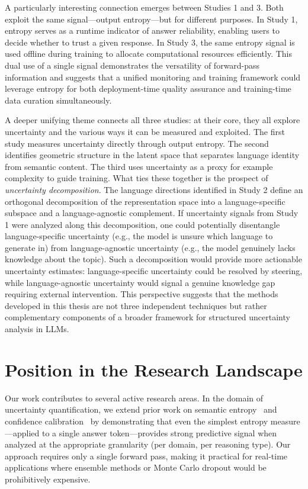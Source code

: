 A particularly interesting connection emerges between Studies 1 and 3. Both exploit the same signal---output entropy---but for different purposes. In Study 1, entropy serves as a runtime indicator of answer reliability, enabling users to decide whether to trust a given response. In Study 3, the same entropy signal is used offline during training to allocate computational resources efficiently. This dual use of a single signal demonstrates the versatility of forward-pass information and suggests that a unified monitoring and training framework could leverage entropy for both deployment-time quality assurance and training-time data curation simultaneously.

A deeper unifying theme connects all three studies: at their core, they all explore uncertainty and the various ways it can be measured and exploited. The first study measures uncertainty directly through output entropy. The second identifies geometric structure in the latent space that separates language identity from semantic content. The third uses uncertainty as a proxy for example complexity to guide training. What ties these together is the prospect of \textit{uncertainty decomposition}. The language directions identified in Study 2 define an orthogonal decomposition of the representation space into a language-specific subspace and a language-agnostic complement. If uncertainty signals from Study 1 were analyzed along this decomposition, one could potentially disentangle language-specific uncertainty (e.g., the model is unsure which language to generate in) from language-agnostic uncertainty (e.g., the model genuinely lacks knowledge about the topic). Such a decomposition would provide more actionable uncertainty estimates: language-specific uncertainty could be resolved by steering, while language-agnostic uncertainty would signal a genuine knowledge gap requiring external intervention. This perspective suggests that the methods developed in this thesis are not three independent techniques but rather complementary components of a broader framework for structured uncertainty analysis in LLMs.

\section{Position in the Research Landscape}

Our work contributes to several active research areas. In the domain of uncertainty quantification, we extend prior work on semantic entropy~\cite{kuhn2023semantic} and confidence calibration~\cite{guo2017calibration} by demonstrating that even the simplest entropy measure---applied to a single answer token---provides strong predictive signal when analyzed at the appropriate granularity (per domain, per reasoning type). Our approach requires only a single forward pass, making it practical for real-time applications where ensemble methods or Monte Carlo dropout would be prohibitively expensive.

